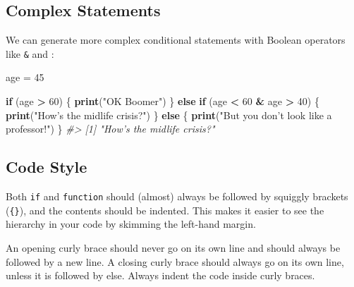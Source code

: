 \documentclass[]{book}
\newenvironment{Shaded}{\begin{snugshade}}{\end{snugshade}}
\newcommand{\KeywordTok}[1]{\textcolor[rgb]{0.13,0.29,0.53}{\textbf{#1}}}
\newcommand{\DecValTok}[1]{\textcolor[rgb]{0.00,0.00,0.81}{#1}}
\newcommand{\StringTok}[1]{\textcolor[rgb]{0.31,0.60,0.02}{#1}}
\newcommand{\CommentTok}[1]{\textcolor[rgb]{0.56,0.35,0.01}{\textit{#1}}}
\newcommand{\ControlFlowTok}[1]{\textcolor[rgb]{0.13,0.29,0.53}{\textbf{#1}}}
\newcommand{\OperatorTok}[1]{\textcolor[rgb]{0.81,0.36,0.00}{\textbf{#1}}}
\newcommand{\NormalTok}[1]{#1}
\begin{document}
\subsection{Complex Statements}\label{complex-statements}

We can generate more complex conditional statements with Boolean
operators like \texttt{\&} and \texttt{\textbar{}}:

\begin{Shaded}
\begin{Highlighting}[]
\NormalTok{age =}\StringTok{ }\DecValTok{45} 

\ControlFlowTok{if}\NormalTok{ (age }\OperatorTok{>}\StringTok{ }\DecValTok{60}\NormalTok{) \{}
    \KeywordTok{print}\NormalTok{(}\StringTok{"OK Boomer"}\NormalTok{)}
\NormalTok{\} }\ControlFlowTok{else} \ControlFlowTok{if}\NormalTok{ (age }\OperatorTok{<}\StringTok{ }\DecValTok{60} \OperatorTok{&}\StringTok{ }\NormalTok{age }\OperatorTok{>}\StringTok{ }\DecValTok{40}\NormalTok{) \{}
    \KeywordTok{print}\NormalTok{(}\StringTok{"How's the midlife crisis?"}\NormalTok{)}
\NormalTok{\} }\ControlFlowTok{else}\NormalTok{ \{}
    \KeywordTok{print}\NormalTok{(}\StringTok{"But you don't look like a professor!"}\NormalTok{)}
\NormalTok{\}}
\CommentTok{#> [1] "How's the midlife crisis?"}
\end{Highlighting}
\end{Shaded}

\subsection{Code Style}\label{code-style}

Both \texttt{if} and \texttt{function} should (almost) always be
followed by squiggly brackets (\texttt{\{\}}), and the contents should
be indented. This makes it easier to see the hierarchy in your code by
skimming the left-hand margin.

An opening curly brace should never go on its own line and should always
be followed by a new line. A closing curly brace should always go on its
own line, unless it is followed by else. Always indent the code inside
curly braces.
\end{document}
